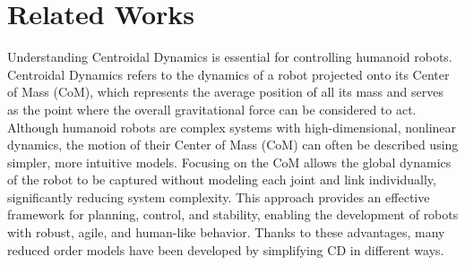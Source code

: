 \documentclass[main.tex]{subfiles}
\begin{document}
\section{Related Works}\label{sec:relatedworks}
Understanding Centroidal Dynamics \cite{orin2013centroidal} is essential for controlling humanoid robots. Centroidal Dynamics \cite{orin2013centroidal} refers to the dynamics of a robot projected onto its Center of Mass (CoM),  which represents the average position of all its mass and serves as the point where the overall gravitational force can be considered to act. Although humanoid robots are complex systems with high-dimensional, nonlinear dynamics, the motion of their Center of Mass (CoM) can often be described using simpler, more intuitive models. Focusing on the CoM allows the global dynamics of the robot to be captured without modeling each joint and link individually, significantly reducing system complexity. This approach provides an effective framework for planning, control, and stability, enabling the development of robots with robust, agile, and human-like behavior. Thanks to these advantages, many reduced order models have been developed by simplifying CD in different ways.\\
\end{document}
